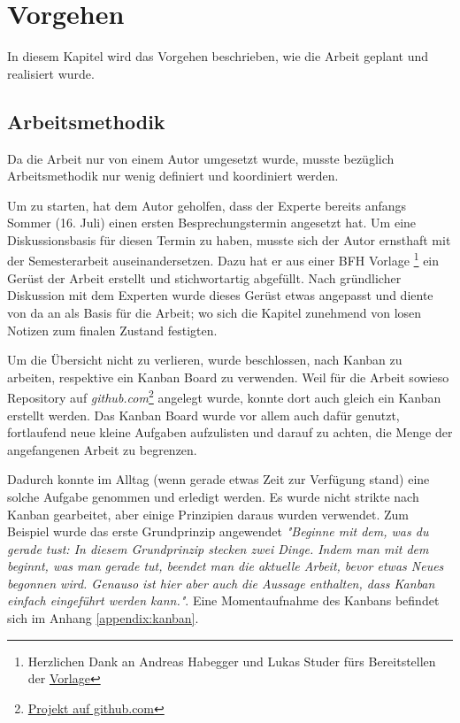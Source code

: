 \section{Vorgehen}
In diesem Kapitel wird das Vorgehen beschrieben, wie die Arbeit geplant und realisiert wurde.

\subsection{Arbeitsmethodik}
Da die Arbeit nur von einem Autor umgesetzt wurde, musste bezüglich Arbeitsmethodik nur wenig definiert und koordiniert werden.

Um zu starten, hat dem Autor geholfen, dass der Experte \prof\space bereits anfangs Sommer (16. Juli) einen ersten Besprechungstermin angesetzt hat. Um eine Diskussionsbasis für diesen Termin zu haben, musste sich der Autor ernsthaft mit der Semesterarbeit auseinandersetzen. Dazu hat er aus einer BFH Vorlage \footnote{Herzlichen Dank an Andreas Habegger und Lukas Studer fürs Bereitstellen der \href{https://gitlab.ti.bfh.ch/latex-utils/tpl_latex-thesis}{Vorlage}} ein Gerüst der Arbeit erstellt und stichwortartig abgefüllt. Nach gründlicher Diskussion mit dem Experten wurde dieses Gerüst etwas angepasst und diente von da an als Basis für die Arbeit; wo sich die Kapitel zunehmend von losen Notizen zum finalen Zustand festigten.

Um die Übersicht nicht zu verlieren, wurde beschlossen, nach Kanban zu arbeiten, respektive ein Kanban Board zu verwenden. Weil für die Arbeit sowieso Repository auf \emph{github.com}\footnote{\href{https://github.com/bfh-semesterarbeit/spot-geoprocessing/projects/1}{Projekt auf github.com}} angelegt wurde, konnte dort auch gleich ein Kanban erstellt werden. Das Kanban Board wurde vor allem auch dafür genutzt, fortlaufend neue kleine Aufgaben aufzulisten und darauf zu achten, die Menge der angefangenen Arbeit zu begrenzen.

Dadurch konnte im Alltag (wenn gerade etwas Zeit zur Verfügung stand) eine solche Aufgabe genommen und erledigt werden. Es wurde nicht strikte nach Kanban gearbeitet, aber einige Prinzipien daraus wurden verwendet. Zum Beispiel wurde das erste Grundprinzip angewendet \textit{"Beginne mit dem, was du gerade tust:
In diesem Grundprinzip stecken zwei Dinge. Indem man mit dem beginnt, was man gerade tut, beendet man die aktuelle Arbeit, bevor etwas Neues begonnen wird. Genauso ist hier aber auch die Aussage enthalten, dass Kanban einfach eingeführt werden kann."}\cite{kanban2010}. Eine Momentaufnahme des Kanbans befindet sich im Anhang \ref{appendix:kanban}.

